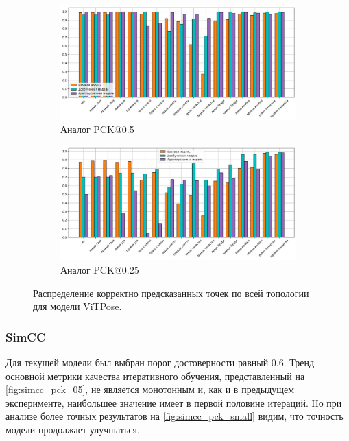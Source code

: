 \begin{figure}[H]
\centering
\begin{subfigure}{.8\textwidth}
	\centering
	\includegraphics[width=\textwidth]{./images/experiment/results/vitpose/vitpose_05_s}
	\caption{Аналог PCK@0.5}
	\label{fig:vitpose_distr_05}
\end{subfigure}
\begin{subfigure}{.8\textwidth}
	\centering
	\includegraphics[width=\textwidth]{./images/experiment/results/vitpose/vitpose_025_s}
	\caption{Аналог PCK@0.25}
	\label{fig:vitpose_distr_025}
\end{subfigure}
\caption{Распределение корректно предсказанных точек по всей топологии для модели ViTPose.}
\label{fig:vitpose_distr}
\end{figure}

\subsubsection*{SimCC}

Для текущей модели был выбран порог достоверности равный 0.6. Тренд основной метрики качества итеративного обучения, представленный на \autoref{fig:simcc_pck_05}, не является монотонным и, как и в предыдущем эксперименте, наибольшее значение имеет в первой половине итераций. Но при анализе более точных результатов на \autoref{fig:simcc_pck_small} видим, что точность модели продолжает улучшаться.

